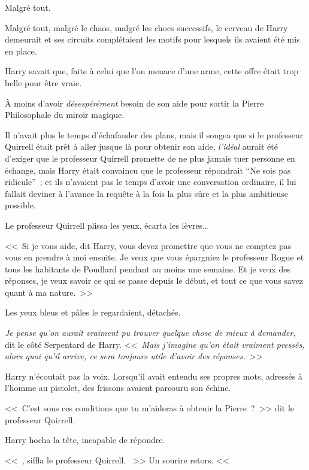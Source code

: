 \later

Malgré tout.

Malgré tout, malgré le chaos, malgré les chocs successifs, le cerveau de Harry demeurait et ses circuits complétaient les motifs pour lesquels ils avaient été mis en place.

Harry savait que, faite à celui que l'on menace d'une arme, cette offre était trop belle pour être vraie.

À moins d'avoir \emph{désespérément} besoin de son aide pour sortir la Pierre Philosophale du miroir magique.

Il n'avait plus le temps d'échafauder des plans, mais il songea que si le professeur Quirrell était prêt à aller jusque là pour obtenir son aide, \emph{l'idéal} aurait été d'exiger que le professeur Quirrell promette de ne plus jamais tuer personne en échange, mais Harry était convaincu que le professeur répondrait “Ne sois pas ridicule”~; et ils n'avaient pas le temps d'avoir une conversation ordinaire, il lui fallait deviner à l'avance la requête à la fois la plus sûre et la plus ambitieuse possible.

Le professeur Quirrell plissa les yeux, écarta les lèvres…

<<~Si je vous aide, dit Harry, vous devez promettre que vous ne comptez pas vous en prendre à moi ensuite. Je veux que vous épargniez le professeur Rogue et tous les habitants de Poudlard pendant au moins une semaine. Et je veux des réponses, je veux savoir ce qui se passe depuis le début, et tout ce que vous savez quant à ma nature.~>>

Les yeux bleus et pâles le regardaient, détachés.

\emph{Je pense qu'on aurait vraiment pu trouver quelque chose de mieux à demander}, dit le côté Serpentard de Harry. <<~\emph{Mais j'imagine qu'on était vraiment pressés, alors quoi qu'il arrive, ce sera toujours utile d'avoir des réponses.}~>>

Harry n'écoutait pas la voix. Lorsqu'il avait entendu ses propres mots, adressés à l'homme au pistolet, des frissons avaient parcouru son échine.

<<~C'est sous ces conditions que tu m'aideras à obtenir la Pierre~?~>> dit le professeur Quirrell.

Harry hocha la tête, incapable de répondre.

<<~, siffla le professeur Quirrell. ~>> Un sourire retors. <<~

